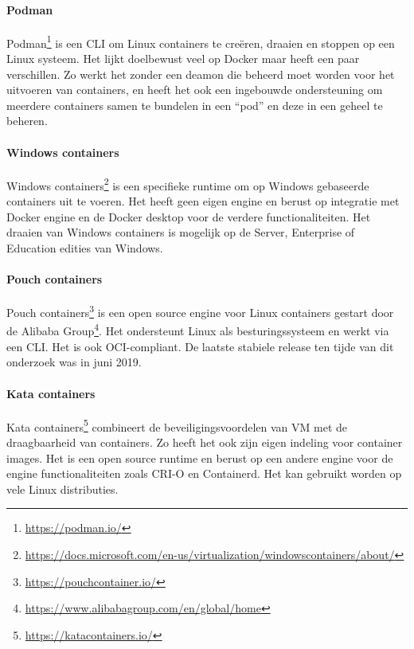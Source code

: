 \paragraph{Podman}
Podman\footnote{\url{https://podman.io/}} is een CLI om Linux containers te creëren, draaien en stoppen op een Linux systeem. Het lijkt doelbewust veel op Docker maar heeft een paar verschillen. Zo werkt het zonder een deamon die beheerd moet worden voor het uitvoeren van containers, en heeft het ook een ingebouwde ondersteuning om meerdere containers samen te bundelen in een “pod” en deze in een geheel te beheren.
\paragraph{Windows containers}
Windows containers\footnote{\url{https://docs.microsoft.com/en-us/virtualization/windowscontainers/about/}} is een specifieke runtime om op Windows gebaseerde containers uit te voeren. Het heeft geen eigen engine en berust op integratie met Docker engine en de Docker desktop voor de verdere functionaliteiten. Het draaien van Windows containers is mogelijk op de Server, Enterprise of Education edities van Windows.
\paragraph{Pouch containers}
Pouch containers\footnote{\url{https://pouchcontainer.io/}} is een open source engine voor Linux containers gestart door de Alibaba Group\footnote{\url{https://www.alibabagroup.com/en/global/home}}. Het ondersteunt Linux als besturingssysteem en werkt via een CLI. Het is ook OCI-compliant. De laatste stabiele release ten tijde van dit onderzoek was in juni 2019.
\paragraph{Kata containers}
Kata containers\footnote{\url{https://katacontainers.io/}} combineert de beveiligingsvoordelen van VM met de draagbaarheid van containers. Zo heeft het ook zijn eigen indeling voor container images. Het is een open source runtime en berust op een andere engine voor de engine functionaliteiten zoals CRI-O en Containerd. Het kan gebruikt worden op vele Linux distributies.
